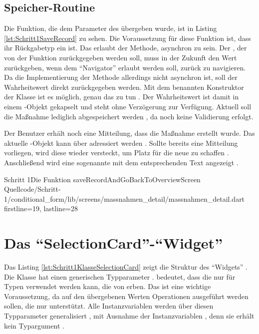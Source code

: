 
\ifodd\value{page}\hbox{}\newpage\fi
\subsection{Speicher-Routine}


Die Funktion, die dem Parameter  des  übergeben wurde, ist in Listing \ref{lst:Schritt1SaveRecord} zu sehen.
Die Voraussetzung für diese Funktion ist, dass ihr Rückgabetyp ein  ist.
Das erlaubt der Methode, asynchron zu sein.
Der , der von der Funktion zurückgegeben werden soll, muss in der Zukunft den Wert  zurückgeben, wenn dem \enquote{Navigator} erlaubt  werden soll, zurück zu navigieren.
Da die Implementierung der Methode allerdings nicht asynchron ist, soll der Wahrheitswert direkt zurückgegeben werden.
Mit dem benannten Konstruktor  der Klasse  ist es möglich, genau das zu tun .
 Der Wahrheitswert ist damit in einem -Objekt gekapselt und steht ohne Verzögerung zur Verfügung.
Aktuell soll die Maßnahme lediglich abgespeichert werden , da noch keine Validierung erfolgt.

Der Benutzer erhält noch eine Mitteilung,
dass die Maßnahme erstellt wurde.
Das aktuelle -Objekt kann über  adressiert werden . Sollte bereits eine Mitteilung vorliegen,
wird diese wieder versteckt,
um Platz für die neue zu schaffen . Anschließend wird eine sogenannte  mit dem entsprechenden Text angezeigt .

\begin{alexlisting}{Schritt 1}{Die Funktion saveRecordAndGoBackToOverviewScreen}
  {Quellcode/Schritt-1/conditional_form/lib/screens/massnahmen_detail/massnahmen_detail.dart}
  {firstline=19, lastline=28}
  \label{lst:Schritt1SaveRecord}
\end{alexlisting}



\section{Das \enquote{SelectionCard}-\enquote{Widget}}

Das Listing \ref{lst:Schritt1KlasseSelectionCard} zeigt die Struktur des \enquote{Widgets} .
Die Klasse hat einen generischen Typparameter .
 bedeutet, dass die  nur für Typen verwendet werden kann, die von  erben.
Das ist eine wichtige Voraussetzung, da auf den übergebenen Werten Operationen ausgeführt werden sollen, die nur  unterstützt.
Alle Instanzvariablen werden über diesen Typparameter generalisiert , mit Ausnahme der Instanzvariablen , denn sie erhält kein Typargument .

